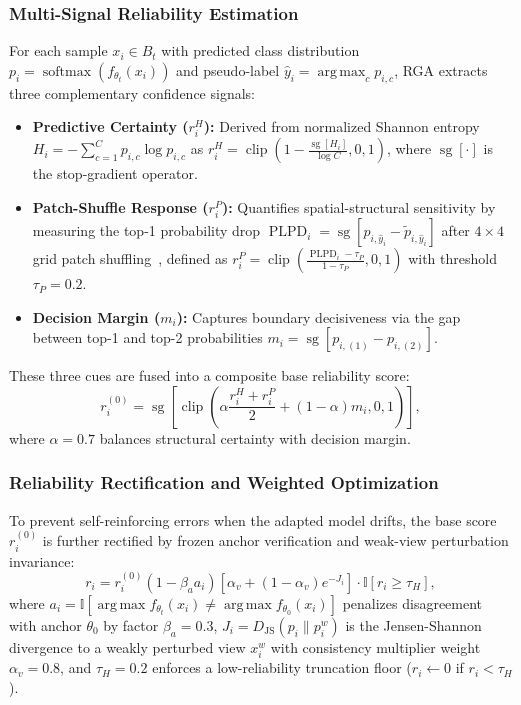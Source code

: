\documentclass[journal]{IEEEtran}
\DeclareMathOperator{\sg}{sg}
\DeclareMathOperator{\clip}{clip}
\DeclareMathOperator{\softmax}{softmax}
\DeclareMathOperator{\PLPD}{PLPD}
\DeclareMathOperator*{\argmax}{arg\,max}
\begin{document}
\subsubsection{Multi-Signal Reliability Estimation}
For each sample $x_i \in B_t$ with predicted class distribution $p_i = \softmax(f_{\theta_t}(x_i))$ and pseudo-label $\hat{y}_i = \argmax_c p_{i,c}$, RGA extracts three complementary confidence signals:
\begin{itemize}[leftmargin=*]
    \item \textbf{Predictive Certainty ($r_i^H$):} Derived from normalized Shannon entropy $H_i = -\sum_{c=1}^C p_{i,c} \log p_{i,c}$ as $r_i^H = \clip(1 - \frac{\sg[H_i]}{\log C}, 0, 1)$, where $\sg[\cdot]$ is the stop-gradient operator.
    \item \textbf{Patch-Shuffle Response ($r_i^P$):} Quantifies spatial-structural sensitivity by measuring the top-1 probability drop $\PLPD_i = \sg[p_{i,\hat{y}_i} - \tilde{p}_{i,\hat{y}_i}]$ after $4 \times 4$ grid patch shuffling~\cite{9}, defined as $r_i^P = \clip(\frac{\PLPD_i - \tau_P}{1 - \tau_P}, 0, 1)$ with threshold $\tau_P = 0.2$.
    \item \textbf{Decision Margin ($m_i$):} Captures boundary decisiveness via the gap between top-1 and top-2 probabilities $m_i = \sg[p_{i,(1)} - p_{i,(2)}]$.
\end{itemize}
These three cues are fused into a composite base reliability score:
\begin{equation}
\label{eq:base_reliability}
r_i^{(0)} = \sg\left[\clip\left(\alpha \frac{r_i^H + r_i^P}{2} + (1 - \alpha)m_i, 0, 1\right)\right],
\end{equation}
where $\alpha = 0.7$ balances structural certainty with decision margin.

\subsubsection{Reliability Rectification and Weighted Optimization}
To prevent self-reinforcing errors when the adapted model drifts, the base score $r_i^{(0)}$ is further rectified by frozen anchor verification and weak-view perturbation invariance:
\begin{equation}
\label{eq:final_reliability}
r_i = r_i^{(0)} (1 - \beta_a a_i) \left[\alpha_v + (1 - \alpha_v) e^{-J_i}\right] \cdot \mathbb{I}[r_i \ge \tau_H],
\end{equation}
where $a_i = \mathbb{I}[\argmax f_{\theta_t}(x_i) \neq \argmax f_{\theta_0}(x_i)]$ penalizes disagreement with anchor $\theta_0$ by factor $\beta_a = 0.3$, $J_i = D_{\mathrm{JS}}(p_i \parallel p_i^w)$ is the Jensen-Shannon divergence to a weakly perturbed view $x_i^w$ with consistency multiplier weight $\alpha_v = 0.8$, and $\tau_H = 0.2$ enforces a low-reliability truncation floor ($r_i \leftarrow 0$ if $r_i < \tau_H$).
\end{document}
